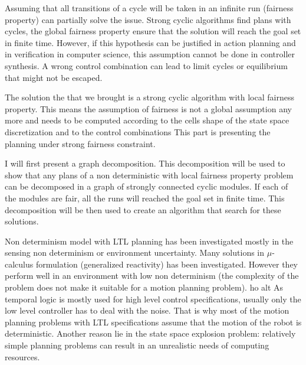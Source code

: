 Assuming that all transitions of a cycle will be taken in an infinite run (fairness property) can partially solve the issue.
Strong cyclic algorithms find plans with cycles, the global fairness property ensure that the solution will reach the goal set in finite time.
However, if this hypothesis can be justified in action planning and in verification in computer science, this assumption cannot be done in controller synthesis.
A wrong control combination can lead to limit cycles or equilibrium that might not be escaped.

The solution the that we brought is a strong cyclic algorithm with local fairness property. This means the assumption of fairness is not a global assumption any more and needs to be computed according to the cells shape of the state space discretization and to the control combinations
This part is presenting the planning under strong fairness constraint.

I will first present a graph decomposition. This decomposition will be used to show that any plans of a non deterministic with local fairness property problem can be decomposed in a graph of strongly connected cyclic modules. If each of the modules are fair, all the runs will reached the goal set in finite time.
This decomposition will be then used to create an algorithm that search for these solutions.

%


Non determinism model with LTL planning has been investigated mostly in the sensing non determinism or environment uncertainty.
Many solutions in $\mu$-calculus formulation (generalized reactivity) has been investigated. However they perform well in an environment with low non determinism (the complexity of the problem does not make it suitable for a motion planning problem).
ho alt
As temporal logic is mostly used for high level control specifications, usually only the low level controller has to deal with the noise.
That is why most of the motion planning problems with LTL specifications  assume that the motion of the robot is deterministic.
Another reason lie in the state space explosion problem: relatively simple planning problems can result in an unrealistic needs of computing resources.

